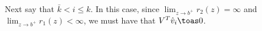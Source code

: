 Next say that $\bar k < i \leq k$.  In this case, since 
$\lim_{z \to b^+} r_2(z) = \infty$ and $\lim_{z \to b^+} r_1(z) < \infty$, we must have that  $V^T \hat v_i \toas 0$.




